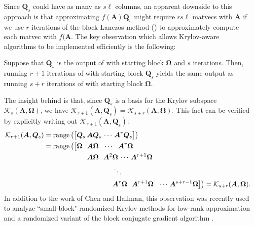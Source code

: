 Since $\bm{Q}_s$ could have as many as $s\ell$ columns, an apparent downside to this approach is that approximating $f(\bm{A})\bm{Q}_s$ might require $rs\ell$ matvecs with $\bm{A}$ if we use $r$ iterations of the block Lanczos method () to approximately compute each matvec with $f(\bm{A}$.
The key observation which allows Krylov-aware algorithms to be implemented efficiently is the following: 
\begin{lemma}\label{lemma:krylovkrylov}
    Suppose that $\bm{Q}_s$ is the output of  with starting block $\bm{\Omega}$ and $s$ iterations. Then, running $r+1$ iterations of  with starting block $\bm{Q}_s$ yields the same output as running $s+r$ iterations of  with starting block $\bm{\Omega}$. 
    \end{lemma}
The insight behind  is that, since $\bm{Q}_s$ is a basis for the Krylov subspace $\mathcal{K}_s(\bm{A},\bm{\Omega})$, we have $\mathcal{K}_{r+1}(\bm{A},\bm{Q}_s) = \mathcal{K}_{s+r}(\bm{A},\bm{\Omega})$. This fact can be verified by explicitly writing out $\mathcal{K}_{r+1}(\bm{A},\bm{Q}_s)$:
\begin{align*}
    \mathcal{K}_{r+1}(\bm{A},\bm{Q}_s) &= \range\big( \big[ \bm{Q}_s \,\bm{A}\bm{Q}_s \, \cdots \, \bm{A}^r\bm{Q}_s \big]\big)\\
    &=  \range\big( \big[\bm{\Omega} \,\hspace{5pt}\bm{A}\bm{\Omega} \, \hspace{5pt}\cdots\hspace{5pt} \, \bm{A}^r\bm{\Omega}\\%
    &\hspace{2.2cm} \bm{A} \bm{\Omega} \,\hspace{5pt} \bm{A}^2\bm{\Omega} \, \cdots \, \bm{A}^{r+1} \bm{\Omega}\\
    & \hspace{3.5cm} \ddots\\
    & \hspace{3.5cm} \bm{A}^r \bm{\Omega} \,\hspace{5pt}\bm{A}^{r+1} \bm{\Omega} \,\hspace{5pt} \cdots \, \bm{A}^{s+r-1} \bm{\Omega} \big] \big) = \mathcal{K}_{s+r}(\bm{A},\bm{\Omega}). 
\end{align*}
In addition to the work of Chen and Hallman, this observation was recently used to analyze ``small-block" randomized Krylov methods for low-rank approximation \cite{MeyerMuscoMusco:2024} and a randomized variant of the block conjugate gradient algorithm \cite{BCGPreconditioning}.
    
